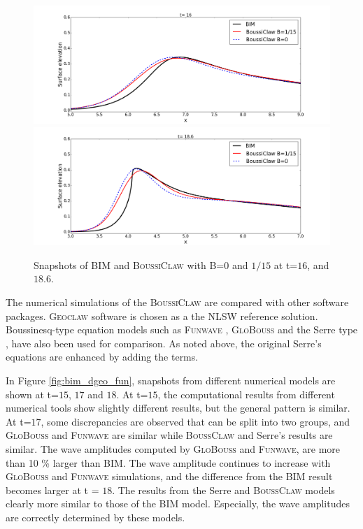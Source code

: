 \documentclass[review]{elsarticle}
\begin{document}
\begin{figure}[!htb]
\centering
\includegraphics[width=.9\textwidth]{_fig/bim_dgeo_160.png}\\
\includegraphics[width=.9\textwidth]{_fig/bim_dgeo_186.png}
\caption{Snapshots of BIM and \textsc{BoussiClaw} with B=$0$ and $1/15$ at t=$16$, and $18.6$.}
\label{fig:bim_dgeo}
\end{figure}

The numerical simulations of 
the \textsc{BoussiClaw} are compared
with other software packages. 
\textsc{Geoclaw} software \citet{clawpack} is chosen
as a the NLSW reference solution.
Boussinesq-type equation models
such as \textsc{Funwave} \citet{shi2012high}, \textsc{GloBouss} \citet{lovholt2010coupling} and the Serre type \citet{Lovholt:2013a}, 
have also been used for comparison.
As noted above, 
the original Serre's equations are enhanced by adding the \citet{schaffer1995further} terms. 

In Figure \ref{fig:bim_dgeo_fun}, snapshots from different
numerical models are shown at t=$15$, $17$ and $18$. 
At t=$15$, the computational results
from different numerical tools show slightly different results,
but the general pattern is similar.
At t=$17$, some discrepancies are observed 
that can be split into two groups, and
\textsc{GloBouss} and \textsc{Funwave} 
are similar while \textsc{BoussClaw}
and Serre's results are similar. 
The wave amplitudes computed by \textsc{GloBouss} and \textsc{Funwave},
are more than 10 \% larger than BIM.
The wave amplitude continues to increase 
with \textsc{GloBouss} and \textsc{Funwave} simulations,
and the difference from the BIM result becomes larger at t = $18$. 
The results from the Serre and \textsc{BoussClaw} models clearly
more similar to those of the BIM model. 
Especially, the wave amplitudes are correctly determined by these models.
\end{document}
